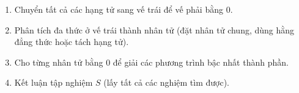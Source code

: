 \begin{enumerate}
\item Chuyển tất cả các hạng tử sang vế trái để vế phải bằng $0$.
\item Phân tích đa thức ở vế trái thành nhân tử (đặt nhân tử chung, dùng hằng đẳng thức hoặc tách hạng tử).
\item Cho từng nhân tử bằng $0$ để giải các phương trình bậc nhất thành phần.
\item Kết luận tập nghiệm $S$ (lấy tất cả các nghiệm tìm được).
\end{enumerate}
